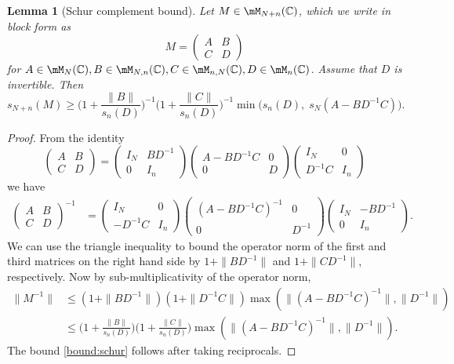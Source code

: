 \documentclass[aop,preprint]{imsart}
\theoremstyle{plain}
\newtheorem{lemma}[theorem]{Lemma}
\theoremstyle{definition}
\theoremstyle{remark}
\numberwithin{equation}{section}
\numberwithin{theorem}{section}
\begin{document}
\begin{lemma}[Schur complement bound]		\label{lem:schur}
Let $M\in \mM_{N+n}(\C)$, which we write in block form as
$$M=\begin{pmatrix} A & B\\ C&D\end{pmatrix}$$
for $A\in \mM_{N}(\C), B\in \mM_{N,n}(\C), C\in \mM_{n,N}(\C), D\in \mM_n(\C)$.
Assume that $D$ is invertible.
Then
\begin{equation}	\label{bound:schur}
s_{N+n}(M) \ge \bigg(1+ \frac{\|B\|}{s_n(D)}\bigg)^{-1} \bigg(1+ \frac{\|C\|}{s_n(D)}\bigg)^{-1}  \min\Big( s_n(D), \;s_N(A-BD^{-1}C)\Big) .
\end{equation}
\end{lemma}

\begin{proof}
From the identity
\[
\begin{pmatrix} A & B\\ C&D\end{pmatrix}= 
\begin{pmatrix} I_N & BD^{-1} \\ 0&I_n\end{pmatrix}
\begin{pmatrix} A-BD^{-1}C & 0\\ 0&D\end{pmatrix}
\begin{pmatrix} I_N & 0\\ D^{-1}C&I_n\end{pmatrix}
\]
we have
\begin{align*}
\begin{pmatrix} A & B\\ C&D\end{pmatrix}^{-1} &= 
\begin{pmatrix} I_N & 0\\ -D^{-1}C&I_n\end{pmatrix}
\begin{pmatrix} (A-BD^{-1}C)^{-1} & 0\\ 0&D^{-1}\end{pmatrix}
\begin{pmatrix} I_N & -BD^{-1} \\ 0&I_n\end{pmatrix}.
\end{align*}
We can use the triangle inequality to bound the operator norm of the first and third matrices on the right hand side by $1+\|BD^{-1}\|$ and $1+\|CD^{-1}\|$, respectively. 
Now by sub-multiplicativity of the operator norm,
\begin{align*}
\|M^{-1}\| &\le (1+\|BD^{-1}\|)(1+\|D^{-1}C\|) \max(\|(A-BD^{-1}C)^{-1}\|,\|D^{-1}\|) \\
&\le \bigg( 1+ \frac{\|B\|}{s_n(D)}\bigg)\bigg( 1+ \frac{\|C\|}{s_n(D)}\bigg) \max(\|(A-BD^{-1}C)^{-1}\|,\|D^{-1}\|).
\end{align*}
The bound \eqref{bound:schur} follows after taking reciprocals. 
\end{proof}
\end{document}
